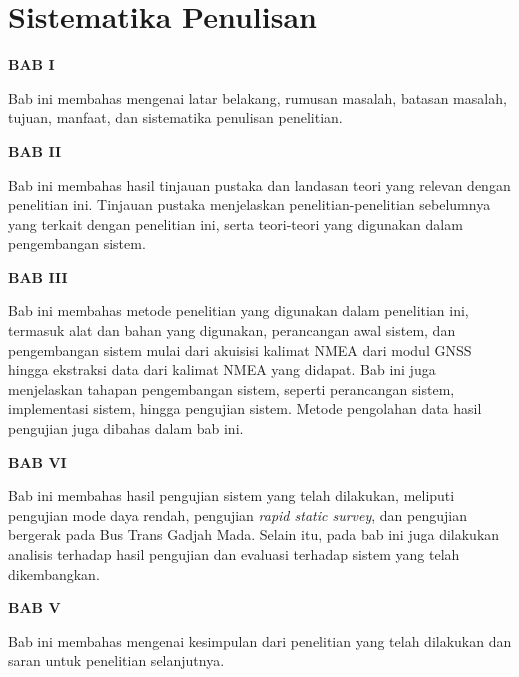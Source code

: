 \section{Sistematika Penulisan}
\textbf{BAB I}

Bab ini membahas mengenai latar belakang, rumusan masalah, batasan masalah, tujuan, manfaat, dan sistematika penulisan penelitian.

\textbf{BAB II}

Bab ini membahas hasil tinjauan pustaka dan landasan teori yang relevan dengan penelitian ini. Tinjauan pustaka menjelaskan penelitian-penelitian sebelumnya yang terkait dengan penelitian ini, serta teori-teori yang digunakan dalam pengembangan sistem.

\textbf{BAB III}

Bab ini membahas metode penelitian yang digunakan dalam penelitian ini, termasuk alat dan bahan yang digunakan, perancangan awal sistem, dan pengembangan sistem mulai dari akuisisi kalimat NMEA dari modul GNSS hingga ekstraksi data dari kalimat NMEA yang didapat. Bab ini juga menjelaskan tahapan pengembangan sistem, seperti perancangan sistem, implementasi sistem, hingga pengujian sistem. Metode pengolahan data hasil pengujian juga dibahas dalam bab ini.  

\textbf{BAB VI}

Bab ini membahas hasil pengujian sistem yang telah dilakukan, meliputi pengujian mode daya rendah, pengujian \textit{rapid static survey}, dan pengujian bergerak pada Bus Trans Gadjah Mada. Selain itu, pada bab ini juga dilakukan analisis terhadap hasil pengujian dan evaluasi terhadap sistem yang telah dikembangkan.

\textbf{BAB V}

Bab ini membahas mengenai kesimpulan dari penelitian yang telah dilakukan dan saran untuk penelitian selanjutnya.